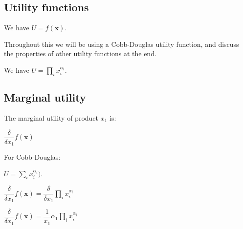 
\subsection{Utility functions}

We have \(U=f(\mathbf x)\).

Throughout this we will be using a Cobb-Douglas utility function, and discuss the properties of other utility functions at the end.

We have \(U=\prod_i x_i^{\alpha_i}\).

\subsection{Marginal utility}

The marginal utility of product \(x_1\) is:

\(\dfrac{\delta }{\delta x_1}f(\mathbf x)\)

For Cobb-Douglas:

\(U=\sum_i x_i^{\alpha_i})\).

\(\dfrac{\delta }{\delta x_1}f(\mathbf x) = \dfrac{\delta}{\delta x_1} \prod_i x_i^{\alpha_i}\)

\(\dfrac{\delta }{\delta x_1}f(\mathbf x) = \dfrac{1}{x_1}\alpha_1\prod_i x_i^{\alpha_i}\)
